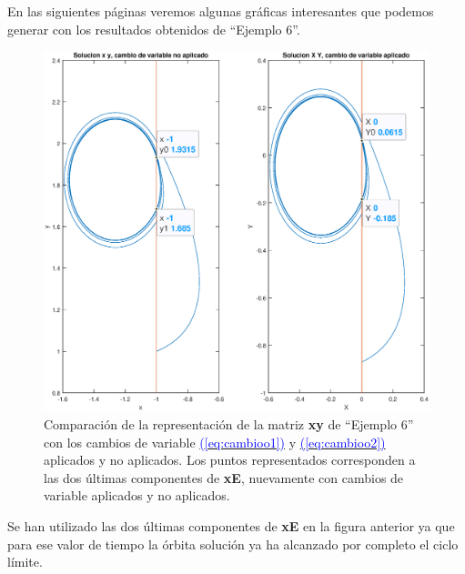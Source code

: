 \documentclass[12pt,a4paper]{report} %
\newcommand{\eref}[1]{\hyperref[#1]{\textcolor{blue}{(\ref*{#1})}}}
\newcommand{\eref}[1]{\hyperref[#1]{\textcolor{blue}{\textit{(\ref*{#1})}}}}
\begin{document}
    \vspace{1cm}En las siguientes páginas veremos algunas gráficas interesantes que podemos generar con los resultados obtenidos de ``Ejemplo 6''.
    
    \newpage
    
    	\begin{figure}[h]
    	\centering
    	\includegraphics[width=1.2\textwidth,center]{g1ejem6tiempo.eps}
    	\caption{Comparación de la representación de la matriz \textbf{xy} de ``Ejemplo 6'' con los cambios de variable \eref{eq:cambioo1} y \eref{eq:cambioo2} aplicados y no aplicados. Los puntos representados corresponden a las dos últimas componentes de \textbf{xE}, nuevamente con cambios de variable aplicados y no aplicados.}
    	\label{fig:g1ejem6}
    \end{figure}\smallskip
    
    \vspace{0.5cm}\noindent Se han utilizado las dos últimas componentes de \textbf{xE} en la figura anterior ya que para ese valor de tiempo la órbita solución ya ha alcanzado por completo el ciclo límite.
    
    \newpage
    
\end{document}
